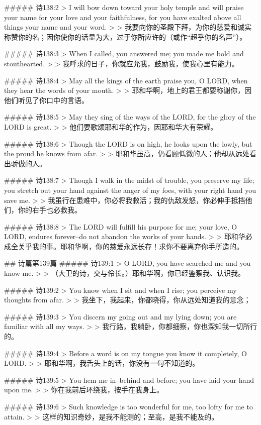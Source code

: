 ##### 诗138:2
> I will bow down toward your holy temple and will praise your name for your love and your faithfulness, for you have exalted above all things your name and your word.
>
> 我要向你的圣殿下拜，为你的慈爱和诚实称赞你的名；因你使你的话显为大，过于你所应许的（或作“超乎你的名声”）。


##### 诗138:3
> When I called, you answered me; you made me bold and stouthearted.
>
> 我呼求的日子，你就应允我，鼓励我，使我心里有能力。


##### 诗138:4
> May all the kings of the earth praise you, O LORD, when they hear the words of your mouth.
>
> 耶和华啊，地上的君王都要称谢你，因他们听见了你口中的言语。


##### 诗138:5
> May they sing of the ways of the LORD, for the glory of the LORD is great.
>
> 他们要歌颂耶和华的作为，因耶和华大有荣耀。


##### 诗138:6
> Though the LORD is on high, he looks upon the lowly, but the proud he knows from afar.
>
> 耶和华虽高，仍看顾低微的人；他却从远处看出骄傲的人。


##### 诗138:7
> Though I walk in the midst of trouble, you preserve my life; you stretch out your hand against the anger of my foes, with your right hand you save me.
>
> 我虽行在患难中，你必将我救活；我的仇敌发怒，你必伸手抵挡他们，你的右手也必救我。


##### 诗138:8
> The LORD will fulfill his purpose for me; your love, O LORD, endures forever--do not abandon the works of your hands.
>
> 耶和华必成全关乎我的事。耶和华啊，你的慈爱永远长存！求你不要离弃你手所造的。


## 诗篇第139篇
##### 诗139:1
> O LORD, you have searched me and you know me.
>
> （大卫的诗，交与伶长。）耶和华啊，你已经鉴察我、认识我。


##### 诗139:2
> You know when I sit and when I rise; you perceive my thoughts from afar.
>
> 我坐下，我起来，你都晓得，你从远处知道我的意念；


##### 诗139:3
> You discern my going out and my lying down; you are familiar with all my ways.
>
> 我行路，我躺卧，你都细察，你也深知我一切所行的。


##### 诗139:4
> Before a word is on my tongue you know it completely, O LORD.
>
> 耶和华啊，我舌头上的话，你没有一句不知道的。


##### 诗139:5
> You hem me in--behind and before; you have laid your hand upon me.
>
> 你在我前后环绕我，按手在我身上。


##### 诗139:6
> Such knowledge is too wonderful for me, too lofty for me to attain.
>
> 这样的知识奇妙，是我不能测的；至高，是我不能及的。


